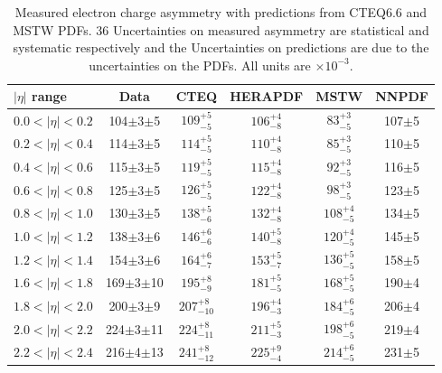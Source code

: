 \begin{table}[htbp]
\begin{center}
\begin{tabular}{lccccc}
\toprule
$|\eta|$ range  & Data & CTEQ & HERAPDF & MSTW & NNPDF \\ \midrule
  $0.0<|\eta|<0.2$ &104$\pm$3$\pm$5 &$109^{+5}_{-5}$ &$106^{+4}_{-8}$ & $83^{+3}_{-5}$& 107$\pm$5\\
  $0.2<|\eta|<0.4$ &114$\pm$3$\pm$5 &$114^{+5}_{-5}$ &$110^{+4}_{-8}$ & $85^{+3}_{-5}$& 110$\pm$5\\
  $0.4<|\eta|<0.6$ &115$\pm$3$\pm$5 &$119^{+5}_{-5}$ &$115^{+4}_{-8}$ & $92^{+3}_{-5}$& 116$\pm$5\\
  $0.6<|\eta|<0.8$ &125$\pm$3$\pm$5 &$126^{+5}_{-5}$ &$122^{+4}_{-8}$ & $98^{+3}_{-5}$& 123$\pm$5\\
  $0.8<|\eta|<1.0$ &130$\pm$3$\pm$5 &$138^{+5}_{-6}$ &$132^{+4}_{-8}$ & $108^{+4}_{-5}$& 134$\pm$5\\
  $1.0<|\eta|<1.2$ &138$\pm$3$\pm$6 &$146^{+6}_{-6}$ &$140^{+5}_{-8}$ & $120^{+4}_{-5}$&145$\pm$5 \\
  $1.2<|\eta|<1.4$ &154$\pm$3$\pm$6 &$164^{+6}_{-7}$ &$153^{+5}_{-7}$ & $136^{+5}_{-5}$&158$\pm$5 \\
  $1.6<|\eta|<1.8$ &169$\pm$3$\pm$10 &$195^{+8}_{-9}$ &$181^{+5}_{-5}$ & $168^{+5}_{-5}$&190$\pm$4 \\
  $1.8<|\eta|<2.0$ &200$\pm$3$\pm$9 &$207^{+8}_{-10}$ &$196^{+4}_{-3}$ & $184^{+6}_{-5}$&206$\pm$4 \\
  $2.0<|\eta|<2.2$ &224$\pm$3$\pm$11 &$224^{+8}_{-11}$ &$211^{+5}_{-3}$ & $198^{+6}_{-5}$&219$\pm$4 \\
  $2.2<|\eta|<2.4$ &216$\pm$4$\pm$13 &$241^{+8}_{-12}$ &$225^{+9}_{-4}$ & $214^{+6}_{-5}$&231$\pm$5 \\
\bottomrule
\end{tabular}
\caption{Measured electron charge asymmetry with predictions from CTEQ6.6 and
MSTW PDFs.  36 Uncertainties on measured asymmetry are statistical and
systematic respectively and the Uncertainties on predictions are due to the
uncertainties on the PDFs. All units are $\times 10^{-3}$\cite{bendavid2011electron}.}
\label{tab:updatedresults}
\end{center}
\end{table}

